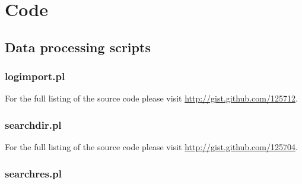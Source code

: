 \newpage


\section{Code}
\label{sec:code}

\subsection{Data processing scripts}
\label{subsec:dataprocscripts} 

\subsubsection{logimport.pl}
\label{code:logimport}

For the full listing of the source code please visit \url{http://gist.github.com/125712}. 

\label{lst:antenna_adress_conversions}



\subsubsection{searchdir.pl}
\label{code:searchdir}

For the full listing of the source code please visit \url{http://gist.github.com/125704}.




\subsubsection{searchres.pl}
\label{code:searchres}

